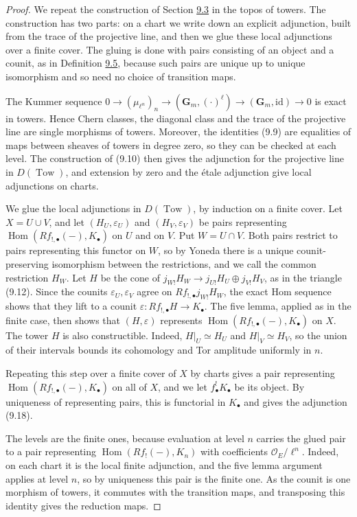 \documentclass[11pt]{article}
\begin{document}
\begin{proof}[{Proof}]\label{bp59}%
We repeat the construction of Section \hyperref[bp15]{9.3} in the topos of towers. The construction has two parts: on a chart we write down an explicit adjunction, built from the trace of the projective line, and then we glue these local adjunctions over a finite cover. The gluing is done with pairs consisting of an object and a counit, as in Definition \hyperref[bp17]{9.5}, because such pairs are unique up to unique isomorphism and so need no choice of transition maps.

The Kummer sequence \(0\to(\mu_{\ell^n})_n\to(\mathbf G_m,(\cdot)^\ell)\to(\mathbf G_m,\mathrm{id})\to0\) is exact in towers. Hence Chern classes, the diagonal class and the trace of the projective line are single morphisms of towers. Moreover, the identities (9.9) are equalities of maps between sheaves of towers in degree zero, so they can be checked at each level. The construction of (9.10) then gives the adjunction for the projective line in \(D(\operatorname{Tow})\), and extension by zero and the étale adjunction give local adjunctions on charts.

We glue the local adjunctions in \(D(\operatorname{Tow})\), by induction on a finite cover. Let \(X=U\cup V\), and let \((H_U,\varepsilon_U)\) and \((H_V,\varepsilon_V)\) be pairs representing \(\operatorname{Hom}(Rf_{!,\bullet}(-),K_\bullet)\) on \(U\) and on \(V\). Put \(W=U\cap V\). Both pairs restrict to pairs representing this functor on \(W\), so by Yoneda there is a unique counit-preserving isomorphism between the restrictions, and we call the common restriction \(H_W\). Let \(H\) be the cone of \(j_{W!}H_W\to j_{U!}H_U\oplus j_{V!}H_V\), as in the triangle (9.12). Since the counits \(\varepsilon_U,\varepsilon_V\) agree on \(Rf_{!,\bullet}j_{W!}H_W\), the exact Hom sequence shows that they lift to a counit \(\varepsilon:Rf_{!,\bullet}H\to K_\bullet\). The five lemma, applied as in the finite case, then shows that \((H,\varepsilon)\) represents \(\operatorname{Hom}(Rf_{!,\bullet}(-),K_\bullet)\) on \(X\). The tower \(H\) is also constructible. Indeed, \(H|_U\simeq H_U\) and \(H|_V\simeq H_V\), so the union of their intervals bounds its cohomology and Tor amplitude uniformly in \(n\).

Repeating this step over a finite cover of \(X\) by charts gives a pair representing \(\operatorname{Hom}(Rf_{!,\bullet}(-),K_\bullet)\) on all of \(X\), and we let \(f^!_\bullet K_\bullet\) be its object. By uniqueness of representing pairs, this is functorial in \(K_\bullet\) and gives the adjunction (9.18).

The levels are the finite ones, because evaluation at level \(n\) carries the glued pair to a pair representing \(\operatorname{Hom}(Rf_!(-),K_n)\) with coefficients \(\mathcal O_E/\ell^n\). Indeed, on each chart it is the local finite adjunction, and the five lemma argument applies at level \(n\), so by uniqueness this pair is the finite one. As the counit is one morphism of towers, it commutes with the transition maps, and transposing this identity gives the reduction maps.
\end{proof}
\end{document}
